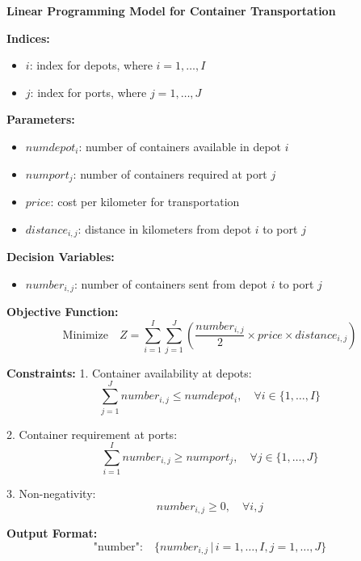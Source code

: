 \documentclass{article}
\begin{document}
\textbf{Linear Programming Model for Container Transportation}

\textbf{Indices:}
\begin{itemize}
    \item $i$: index for depots, where $i = 1, \ldots, I$
    \item $j$: index for ports, where $j = 1, \ldots, J$
\end{itemize}

\textbf{Parameters:}
\begin{itemize}
    \item $numdepot_i$: number of containers available in depot $i$
    \item $numport_j$: number of containers required at port $j$
    \item $price$: cost per kilometer for transportation
    \item $distance_{i,j}$: distance in kilometers from depot $i$ to port $j$
\end{itemize}

\textbf{Decision Variables:}
\begin{itemize}
    \item $number_{i,j}$: number of containers sent from depot $i$ to port $j$
\end{itemize}

\textbf{Objective Function:}
\[
\text{Minimize} \quad Z = \sum_{i=1}^{I} \sum_{j=1}^{J} \left( \frac{number_{i,j}}{2} \times price \times distance_{i,j} \right)
\]

\textbf{Constraints:}
1. Container availability at depots:
\[
\sum_{j=1}^{J} number_{i,j} \leq numdepot_i, \quad \forall i \in \{1, \ldots, I\}
\]

2. Container requirement at ports:
\[
\sum_{i=1}^{I} number_{i,j} \geq numport_j, \quad \forall j \in \{1, \ldots, J\}
\]

3. Non-negativity:
\[
number_{i,j} \geq 0, \quad \forall i, j
\]

\textbf{Output Format:}
\[
\text{"number":} \quad \{number_{i,j} \,|\, i = 1,\ldots,I, j = 1,\ldots,J\}
\]
\end{document}
